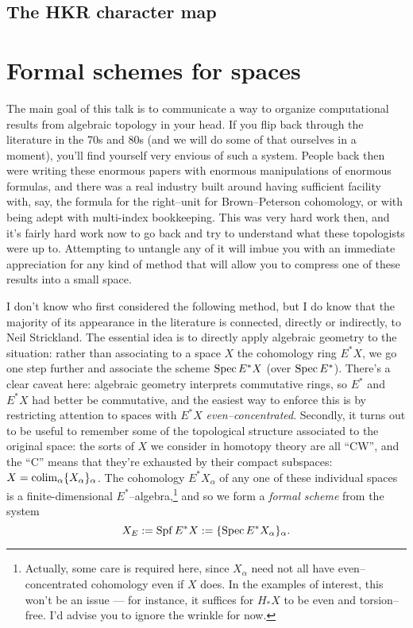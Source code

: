     \subsection*{The HKR character map}


\newpage

\section*{Formal schemes for spaces}

The main goal of this talk is to communicate a way to organize computational results from algebraic topology in your head.  If you flip back through the literature in the 70s and 80s (and we will do some of that ourselves in a moment), you'll find yourself very envious of such a system.  People back then were writing these enormous papers with enormous manipulations of enormous formulas, and there was a real industry built around having sufficient facility with, say, the formula for the right--unit for Brown--Peterson cohomology, or with being adept with multi-index bookkeeping.  This was very hard work then, and it's fairly hard work now to go back and try to understand what these topologists were up to.  Attempting to untangle any of it will imbue you with an immediate appreciation for any kind of method that will allow you to compress one of these results into a small space.

I don't know who first considered the following method, but I do know that the majority of its appearance in the literature is connected, directly or indirectly, to Neil Strickland.  The essential idea is to directly apply algebraic geometry to the situation: rather than associating to a space $X$ the cohomology ring $E^* X$, we go one step further and associate the scheme $\operatorname{Spec} E^* X$ (over $\operatorname{Spec} E^*$).  There's a clear caveat here: algebraic geometry interprets commutative rings, so $E^*$ and $E^* X$ had better be commutative, and the easiest way to enforce this is by restricting attention to spaces with $E^* X$ \emph{even--concentrated}.  Secondly, it turns out to be useful to remember some of the topological structure associated to the original space: the sorts of $X$ we consider in homotopy theory are all ``CW'', and the ``C'' means that they're exhausted by their compact subspaces: $X = \operatorname{colim}_\alpha \{X_\alpha\}_\alpha$.  The cohomology $E^* X_\alpha$ of any one of these individual spaces is a finite-dimensional $E^*$--algebra,\footnote{Actually, some care is required here, since $X_\alpha$ need not all have even--concentrated cohomology even if $X$ does. In the examples of interest, this won't be an issue --- for instance, it suffices for $H_* X$ to be even and torsion--free. I'd advise you to ignore the wrinkle for now.} and so we form a \emph{formal scheme} from the system \[X_E := \operatorname{Spf} E^* X := \{\operatorname{Spec} E^* X_\alpha\}_{\alpha}.\]

